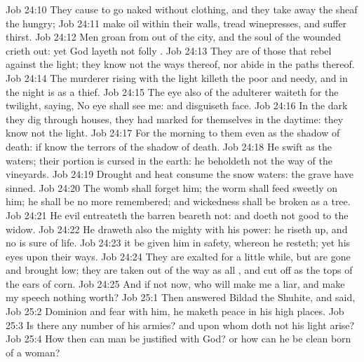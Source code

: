 \vs Job 24:10 They cause  to go naked without clothing, and they take away the sheaf  the hungry;
\vs Job 24:11  make oil within their walls,  tread  winepresses, and suffer thirst.
\vs Job 24:12 Men groan from out of the city, and the soul of the wounded crieth out: yet God layeth not folly .
\vs Job 24:13 They are of those that rebel against the light; they know not the ways thereof, nor abide in the paths thereof.
\vs Job 24:14 The murderer rising with the light killeth the poor and needy, and in the night is as a thief.
\vs Job 24:15 The eye also of the adulterer waiteth for the twilight, saying, No eye shall see me: and disguiseth  face.
\vs Job 24:16 In the dark they dig through houses,  they had marked for themselves in the daytime: they know not the light.
\vs Job 24:17 For the morning  to them even as the shadow of death: if  know  the terrors of the shadow of death.
\vs Job 24:18 He  swift as the waters; their portion is cursed in the earth: he beholdeth not the way of the vineyards.
\vs Job 24:19 Drought and heat consume the snow waters:  the grave  have sinned.
\vs Job 24:20 The womb shall forget him; the worm shall feed sweetly on him; he shall be no more remembered; and wickedness shall be broken as a tree.
\vs Job 24:21 He evil entreateth the barren  beareth not: and doeth not good to the widow.
\vs Job 24:22 He draweth also the mighty with his power: he riseth up, and no  is sure of life.
\vs Job 24:23  it be given him  in safety, whereon he resteth; yet his eyes  upon their ways.
\vs Job 24:24 They are exalted for a little while, but are gone and brought low; they are taken out of the way as all , and cut off as the tops of the ears of corn.
\vs Job 24:25 And if  not  now, who will make me a liar, and make my speech nothing worth?
\vs Job 25:1 Then answered Bildad the Shuhite, and said,
\vs Job 25:2 Dominion and fear  with him, he maketh peace in his high places.
\vs Job 25:3 Is there any number of his armies? and upon whom doth not his light arise?
\vs Job 25:4 How then can man be justified with God? or how can he be clean  born of a woman?
